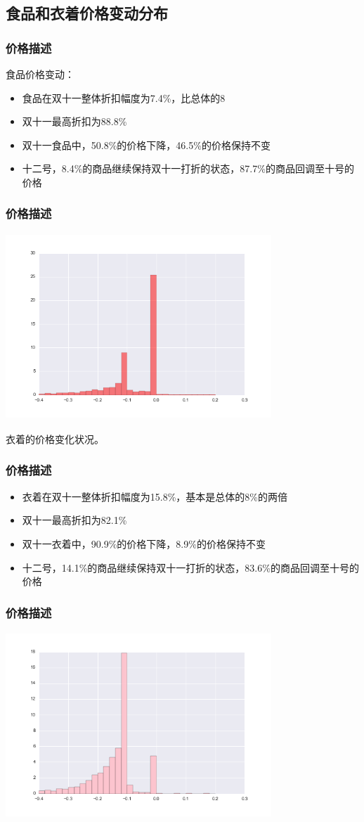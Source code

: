 \documentclass{beamer}
\begin{document}
\subsection{食品和衣着价格变动分布}
\begin{frame}
\frametitle{价格描述}
食品价格变动：
\begin{itemize}
  \item 食品在双十一整体折扣幅度为7.4\%，比总体的8%
  \item 双十一最高折扣为88.8\%
  \item 双十一食品中，50.8\%的价格下降，46.5\%的价格保持不变
  \item 十二号，8.4\%的商品继续保持双十一打折的状态，87.7\%的商品回调至十号的价格
\end{itemize}
\end{frame}
\begin{frame}
\frametitle{价格描述}
\includegraphics[width=10cm,height=7cm]{cate1_pr.png}
\end{frame}
\begin{frame}
衣着的价格变化状况。
\frametitle{价格描述}
\begin{itemize}
  \item 衣着在双十一整体折扣幅度为15.8\%，基本是总体的8\%的两倍
  \item 双十一最高折扣为82.1\%
  \item 双十一衣着中，90.9\%的价格下降，8.9\%的价格保持不变
  \item 十二号，14.1\%的商品继续保持双十一打折的状态，83.6\%的商品回调至十号的价格
\end{itemize}
\end{frame}
\begin{frame}
\frametitle{价格描述}
\includegraphics[width=10cm,height=7cm]{cate3_pr.png}
\end{frame}
\end{document}
